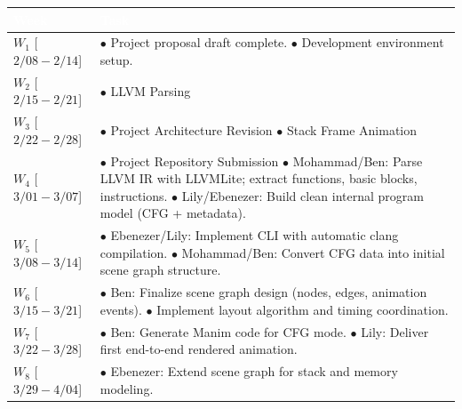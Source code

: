 
\begin{table}[htbp]
\centering
\renewcommand{\arraystretch}{1.5}
\begin{tabularx}{\columnwidth}{|>{\centering\arraybackslash}m{2.5cm}|>{\raggedright\arraybackslash}X|}
\hline
\rowcolor[HTML]{4472C4}
\textcolor{white}{\textbf{Week}} & \textcolor{white}{\textbf{Task}} \\ \hline
$W_1$    [$2/08 - 2/14$] & $\bullet$ Project proposal draft complete. \newline
                           $\bullet$ Development environment setup. \\ \hline
$W_2$    [$2/15 - 2/21$] & $\bullet$ LLVM Parsing \\ \hline
$W_3$    [$2/22 - 2/28$] & $\bullet$ Project Architecture Revision \newline
                           $\bullet$ Stack Frame Animation \\ \hline
$W_4$    [$3/01 - 3/07$] & $\bullet$ Project Repository Submission \newline
                           $\bullet$ Mohammad/Ben: Parse LLVM IR with LLVMLite; extract functions, basic blocks, instructions. \newline
                           $\bullet$ Lily/Ebenezer: Build clean internal program model (CFG + metadata). \\ \hline
$W_5$    [$3/08 - 3/14$] & $\bullet$ Ebenezer/Lily: Implement CLI with automatic clang compilation. \newline
                           $\bullet$ Mohammad/Ben: Convert CFG data into initial scene graph structure. \\ \hline
$W_6$    [$3/15 - 3/21$] & $\bullet$ Ben: Finalize scene graph design (nodes, edges, animation events). \newline
                           $\bullet$ Implement layout algorithm and timing coordination.\\ \hline
$W_7$    [$3/22 - 3/28$] & $\bullet$ Ben: Generate Manim code for CFG mode. \newline
                           $\bullet$ Lily: Deliver first end-to-end rendered animation. \\ \hline
$W_8$    [$3/29 - 4/04$] & $\bullet$ Ebenezer: Extend scene graph for stack and memory modeling. \newline

\end{tabularx}
\end{table}
